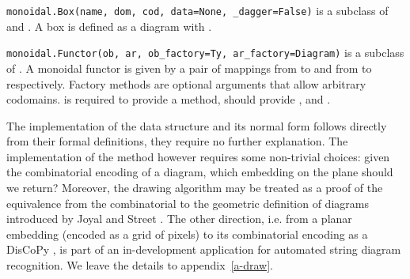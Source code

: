\begin{class}\normalfont\texttt{monoidal.Box(name, dom, cod, data=None, \_dagger=False)} is a subclass of  and . A box  is defined as a diagram with .
\end{class}

\begin{class}\normalfont\texttt{monoidal.Functor(ob, ar, ob\_factory=Ty, ar\_factory=Diagram)} is a subclass of  .
A monoidal functor  is given by a pair of mappings  from  to  and from  to  respectively.
Factory methods are optional arguments that allow arbitrary codomains.
 is required to provide a  method,  should provide ,  and .
\end{class}

The implementation of the  data structure and its normal form follows directly from their formal definitions, they require no further explanation.
The implementation of the  method however requires some non-trivial choices: given the combinatorial encoding of a diagram, which embedding on the plane should we return?
Moreover, the drawing algorithm may be treated as a proof of the equivalence from the combinatorial to the geometric definition of diagrams introduced by Joyal and Street \cite{JoyalStreet88, JoyalStreet91}.
The other direction, i.e. from a planar embedding (encoded as a grid of pixels) to its combinatorial encoding as a DisCoPy , is part of an in-development application for automated string diagram recognition.
We leave the details to appendix~\ref{a-draw}.
